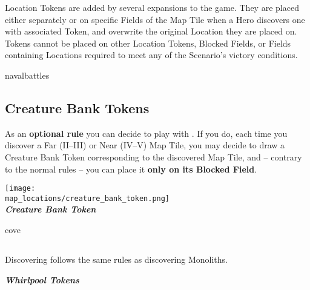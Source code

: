 \begin{multicols}{2}
Location Tokens are added by several expansions to the game.
They are placed either separately or on specific Fields of the Map Tile when a Hero discovers one with associated Token, and overwrite the original Location they are placed on.
Tokens cannot be placed on other Location Tokens, Blocked Fields, or Fields containing Locations required to meet any of the Scenario's victory conditions.

\begin{expansion}[before=\vspace*{0pt}]{navalbattles}
  \subsection*{Creature Bank Tokens}
  As an \textbf{optional rule} you can decide to play with .
  If you do, each time you discover a Far \mbox{(II--III)} or Near \mbox{(IV--V)} Map Tile, you may decide to draw a Creature Bank Token corresponding to the discovered Map Tile, and -- contrary to the normal rules -- you can place it \textbf{only on its Blocked Field}.
  \bigskip
  \begin{center}
    \texttt{[image: \\map\_locations/creature\_bank\_token.png]}\\
    \footnotesize{\textbf{\textit{\textcolor{darkcandyapplered}{Creature Bank Token}}}}
  \end{center}
\end{expansion}

\bigskip

\begin{expansion}[before=\vspace*{0pt}]{cove}
  \subsection*{}
  Discovering  follows the same rules as discovering Monoliths.
  \bigskip

  \begin{center}
    \footnotesize{\textbf{\textit{\textcolor{darkcandyapplered}{Whirlpool Tokens}}}}
  \end{center}
\end{expansion}


\end{multicols}
